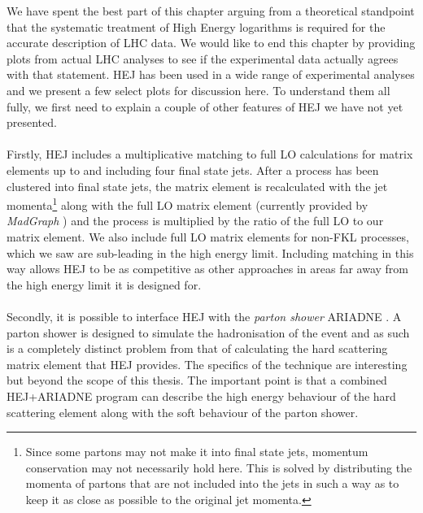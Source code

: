 We have spent the best part of this chapter arguing from a theoretical standpoint that the systematic treatment of High Energy logarithms is required for the accurate description of LHC data. We would like to end this chapter by providing plots from actual LHC analyses to see if the experimental data actually agrees with that statement. HEJ has been used in a wide range of experimental analyses \cite{Aad2011, Chatrchyan2012, Chatrchyan2012a,Abazov2013,Aad2014a,Aad2014,Aad2015} and we present a few select plots for discussion here. To understand them all fully, we first need to explain a couple of other features of HEJ we have not yet presented. \\
\\
Firstly, HEJ includes a multiplicative matching to full LO calculations for matrix elements up to and including four final state jets. After a process has been clustered into final state jets, the matrix element is recalculated with the jet momenta\footnote{Since some partons may not make it into final state jets, momentum conservation may not necessarily hold here. This is solved by distributing the momenta of partons that are not included into the jets in such a way as to keep it as close as possible to the original jet momenta.} along with the full LO matrix element (currently provided by \emph{MadGraph} \cite{Alwall2011}) and the process is multiplied by the ratio of the full LO to our matrix element. We also include full LO matrix elements for non-FKL processes, which we saw are sub-leading in the high energy limit. Including matching in this way allows HEJ to be as competitive as other approaches in areas far away from the high energy limit it is designed for. \\
\\
Secondly, it is possible to interface HEJ with the \emph{parton shower} ARIADNE \cite{Andersen2011}. A parton shower is designed to simulate the hadronisation of the event and as such is a completely distinct problem from that of calculating the hard scattering matrix element that HEJ provides. The specifics of the technique are interesting \cite{Hoche2014} but beyond the scope of this thesis. The important point is that a combined HEJ+ARIADNE program can describe the high energy behaviour of the hard scattering element along with the soft behaviour of the parton shower. 

